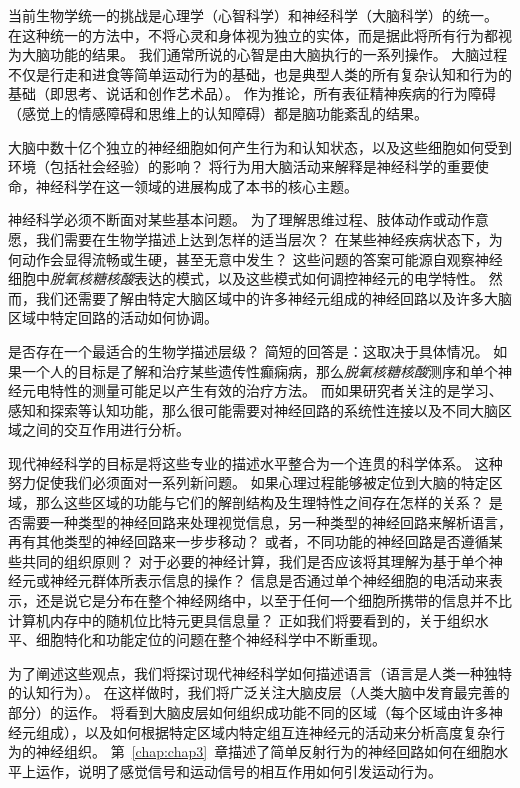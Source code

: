 当前生物学统一的挑战是心理学（心智科学）和神经科学（大脑科学）的统一。
在这种统一的方法中，不将心灵和身体视为独立的实体，而是据此将所有行为都视为大脑功能的结果。
我们通常所说的心智是由大脑执行的一系列操作。 
大脑过程不仅是行走和进食等简单运动行为的基础，也是典型人类的所有复杂认知和行为的基础（即思考、说话和创作艺术品）。
作为推论，所有表征精神疾病的行为障碍（感觉上的情感障碍和思维上的认知障碍）都是脑功能紊乱的结果。


大脑中数十亿个独立的神经细胞如何产生行为和认知状态，以及这些细胞如何受到环境（包括社会经验）的影响？ 
将行为用大脑活动来解释是神经科学的重要使命，神经科学在这一领域的进展构成了本书的核心主题。


神经科学必须不断面对某些基本问题。
为了理解思维过程、肢体动作或动作意愿，我们需要在生物学描述上达到怎样的适当层次？ 
在某些神经疾病状态下，为何动作会显得流畅或生硬，甚至无意中发生？ 
这些问题的答案可能源自观察神经细胞中\textit{脱氧核糖核酸}表达的模式，以及这些模式如何调控神经元的电学特性。
然而，我们还需要了解由特定大脑区域中的许多神经元组成的神经回路以及许多大脑区域中特定回路的活动如何协调。


是否存在一个最适合的生物学描述层级？
简短的回答是：这取决于具体情况。
如果一个人的目标是了解和治疗某些遗传性癫痫病，那么\textit{脱氧核糖核酸}测序和单个神经元电特性的测量可能足以产生有效的治疗方法。
而如果研究者关注的是学习、感知和探索等认知功能，那么很可能需要对神经回路的系统性连接以及不同大脑区域之间的交互作用进行分析。


现代神经科学的目标是将这些专业的描述水平整合为一个连贯的科学体系。
这种努力促使我们必须面对一系列新问题。
如果心理过程能够被定位到大脑的特定区域，那么这些区域的功能与它们的解剖结构及生理特性之间存在怎样的关系？
是否需要一种类型的神经回路来处理视觉信息，另一种类型的神经回路来解析语言，再有其他类型的神经回路来一步步移动？
或者，不同功能的神经回路是否遵循某些共同的组织原则？
对于必要的神经计算，我们是否应该将其理解为基于单个神经元或神经元群体所表示信息的操作？
信息是否通过单个神经细胞的电活动来表示，还是说它是分布在整个神经网络中，以至于任何一个细胞所携带的信息并不比计算机内存中的随机位比特元更具信息量？
正如我们将要看到的，关于组织水平、细胞特化和功能定位的问题在整个神经科学中不断重现。


为了阐述这些观点，我们将探讨现代神经科学如何描述语言（语言是人类一种独特的认知行为）。
在这样做时，我们将广泛关注大脑皮层（人类大脑中发育最完善的部分）的运作。
将看到大脑皮层如何组织成功能不同的区域（每个区域由许多神经元组成），以及如何根据特定区域内特定组互连神经元的活动来分析高度复杂行为的神经组织。
第~\ref{chap:chap3}~章描述了简单反射行为的神经回路如何在细胞水平上运作，说明了感觉信号和运动信号的相互作用如何引发运动行为。



